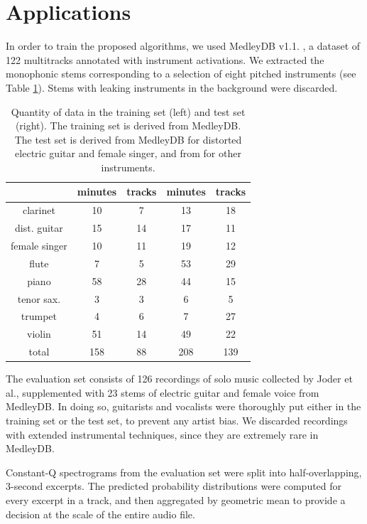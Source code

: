 \documentclass{article}
\makeatletter
\newcommand*{\etal}{et al.\@\xspace}
\makeatother
\begin{document}
\section{Applications}\label{sec:single-instrument}
In order to train the proposed algorithms, we used MedleyDB v1.1. \cite{Bittner2014}, a
dataset of 122 multitracks annotated with instrument activations. 
We extracted the monophonic stems corresponding to a selection of eight pitched
instruments (see Table \ref{table:single-label-durations}).
Stems with leaking instruments in the background were discarded.

\begin{table}
	\begin{center}
	\begin{tabular}{|c|cc|cc|}
		\hline
		& minutes & tracks & minutes & tracks \\
		\hline
		clarinet & 10 & 7 & 13 & 18 \\
		dist. guitar & 15 & 14 & 17 & 11 \\
		female singer & 10 & 11 & 19 & 12 \\
		flute & 7 & 5 & 53 & 29 \\
		piano & 58 & 28 & 44 & 15 \\
		tenor sax. & 3 & 3 & 6 & 5 \\
		trumpet & 4 & 6 & 7 & 27 \\
		violin & 51 & 14 & 49 & 22 \\
		\hline
		total & 158 & 88 & 208 & 139 \\
		\hline
	\end{tabular}
	\end{center}
	\caption{
	Quantity of data in the training set (left) and test set (right).
	The training set is derived from MedleyDB.
	The test set is derived from MedleyDB for distorted electric guitar and female singer,
	and from \cite{Joder2009} for other instruments.
	\label{table:single-label-durations}}
\end{table}

The evaluation set consists of 126 recordings of solo music collected by
Joder \etal \cite{Joder2009}, supplemented with
23 stems of electric guitar and female voice from MedleyDB.
In doing so, guitarists and vocalists were thoroughly put either in the training set or the test set,
to prevent any artist bias.
We discarded recordings with extended instrumental techniques, since they are
extremely rare in MedleyDB.

Constant-Q spectrograms from the evaluation set were split into half-overlapping,
3-second excerpts.
The predicted probability distributions were computed for every excerpt in a track,
and then aggregated by geometric mean to provide a decision at the scale of
the entire audio file.
\end{document}
